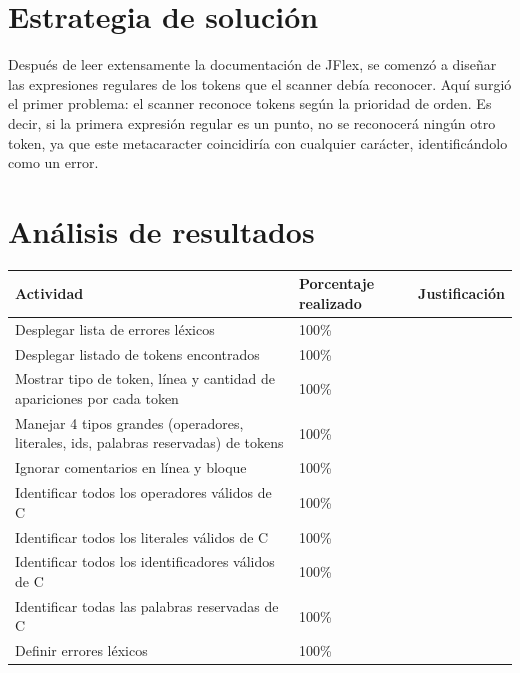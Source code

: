 \documentclass[a4paper,12pt]{article}
\begin{document}
\section*{Estrategia de solución}
\begin{flushleft}
    \hspace*{2em} Después de leer extensamente la documentación 
    de JFlex, se comenzó a diseñar las expresiones regulares 
    de los tokens que el scanner debía reconocer. Aquí surgió 
    el primer problema: el scanner reconoce tokens según la 
    prioridad de orden. Es decir, si la primera expresión 
    regular es un punto, no se reconocerá ningún otro token, 
    ya que este metacaracter coincidiría con cualquier 
    carácter, identificándolo como un error.
\end{flushleft}

\section*{Análisis de resultados}
\begin{table}[h!]
    \centering
    \begin{tabularx}{\textwidth}{|X|X|X|}
        \hline
        Actividad & Porcentaje realizado & Justificación \\ 
        \hline
        Desplegar lista de errores léxicos & 100\% & \\
        \hline
        Desplegar listado de tokens encontrados & 100\% & \\
        \hline
        Mostrar tipo de token, línea y cantidad de apariciones por cada token & 100\% & \\
        \hline
        Manejar 4 tipos grandes (operadores, literales, ids, palabras reservadas) de tokens & 100\% & \\
        \hline
        Ignorar comentarios en línea y bloque & 100\% & \\
        \hline
        Identificar todos los operadores válidos de C & 100\% & \\
        \hline
        Identificar todos los literales válidos de C & 100\% & \\
        \hline
        Identificar todos los identificadores válidos de C & 100\% & \\
        \hline
        Identificar todas las palabras reservadas de C & 100\% & \\
        \hline
        Definir errores léxicos & 100\% & \\
        \hline
    \end{tabularx}
\end{table}
\end{document}
